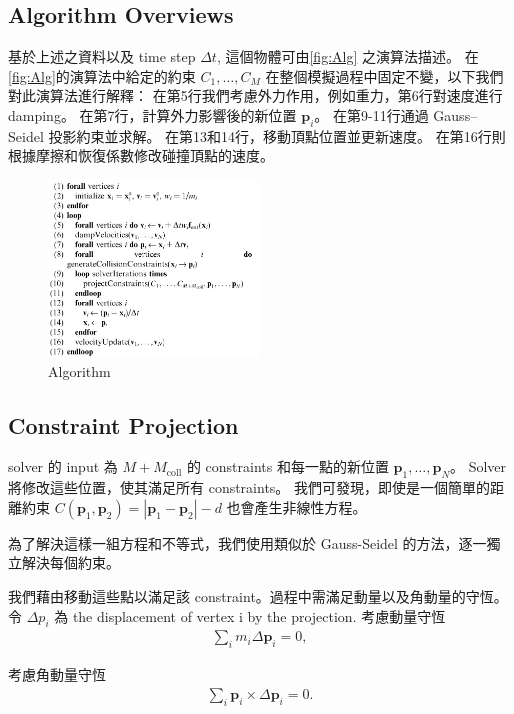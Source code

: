 \documentclass{article}
\begin{document}
\subsection*{Algorithm Overviews}
基於上述之資料以及 time step  $\Delta t$, 這個物體可由\autoref{fig:Alg} 之演算法描述。
在 \autoref{fig:Alg}的演算法中給定的約束 $ C_1, \ldots, C_M $ 在整個模擬過程中固定不變，以下我們對此演算法進行解釋：
在第5行我們考慮外力作用，例如重力，第6行對速度進行 damping。
在第7行，計算外力影響後的新位置 $ \mathbf{p}_i$。
在第9-11行通過 Gauss–Seidel 投影約束並求解。
在第13和14行，移動頂點位置並更新速度。
在第16行則根據摩擦和恢復係數修改碰撞頂點的速度。

\begin{figure}[!ht]
  \centering
  \includegraphics[width=0.5\textwidth]{./figures/alg.png}
  \caption{Algorithm}
  \label{fig:Alg}
\end{figure}


\subsection*{Constraint Projection}
solver  的 input 為 $M + M_{\text{coll}}$ 的 constraints 和每一點的新位置 $\mathbf{p}_1, \ldots, \mathbf{p}_N$。 Solver 將修改這些位置，使其滿足所有 constraints。
我們可發現，即使是一個簡單的距離約束 $C(\mathbf{p}_1, \mathbf{p}_2) = \left|\mathbf{p}_1 - \mathbf{p}_2\right| - d$ 也會產生非線性方程。

為了解決這樣一組方程和不等式，我們使用類似於 Gauss-Seidel 的方法，逐一獨立解決每個約束。

我們藉由移動這些點以滿足該 constraint。過程中需滿足動量以及角動量的守恆。
令 $\Delta p_i$ 為 the displacement of vertex i by the projection.
考慮動量守恆
\begin{align}
  \sum_i m_i \Delta \mathbf{p}_i = 0,
\end{align}

考慮角動量守恆
\begin{align}
  \sum_i \mathbf{p}_i \times \Delta \mathbf{p}_i = 0.
\end{align}
\end{document}
